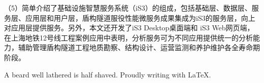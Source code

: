 \begin{cabstract}
（5）简单介绍了基础设施智慧服务系统（iS3）的组成，包括基础层、数据层、服务层、应用层和用户层，盾构隧道服役性能微服务成果集成为iS3的服务层，向上对应用层提供服务。另外，本文还开发了iS3 Desktop桌面端和 iS3 Web网页端，在上海地铁12号线工程案例应用中表明，分析服务可为不同应用提供统一的分析能力，辅助管理盾构隧道工程地质勘察、结构设计、运营监测和养护维护各全寿命期阶段。

\end{cabstract}



\begin{eabstract}

A beard well lathered is half shaved. Proudly writing with \LaTeX{}.

\end{eabstract}

